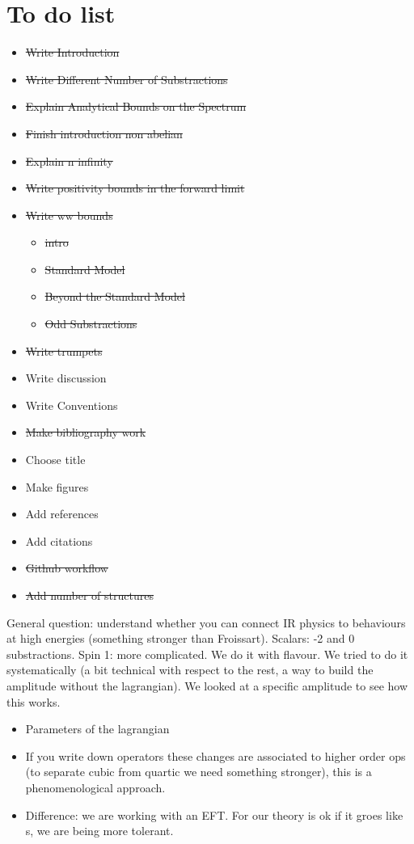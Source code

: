 \chapter{To do list}
\begin{itemize}
    \item \sout{Write Introduction}
    \item \sout{Write Different Number of Substractions}
    \item \sout{Explain Analytical Bounds on the Spectrum }
    \item \sout{Finish introduction non abelian }
    \item \sout{Explain n infinity }
    \item \sout{Write positivity bounds in the forward limit}
    \item \sout{Write ww bounds }
    \begin{itemize}
        \item \sout{intro} 
        \item \sout{Standard Model}
        \item \sout{Beyond the Standard Model}
        \item \sout{Odd Substractions}
    \end{itemize}
    \item \sout{Write trumpets}
    \item Write discussion
    \item Write Conventions 
    \item \sout{Make bibliography work}
    \item Choose title
    \item Make figures
    \item Add references
    \item Add citations
    \item \sout{Github workflow}
    \item \sout{Add number of structures}
\end{itemize}

General question: understand whether you can connect IR physics to behaviours at high energies (something stronger than Froissart). Scalars: -2 and 0 substractions. Spin 1: more complicated. We do it with flavour. We tried to do it systematically (a bit technical with respect to the rest, a way to build the amplitude without the lagrangian). We looked at a specific amplitude to see how this works.
\begin{itemize}
    \item Parameters of the lagrangian 
    \item If you write down operators these changes are associated to higher order ops (to separate cubic from quartic we need something stronger), this is a phenomenological approach.
    \item Difference: we are working with an EFT. For our theory is ok if it groes like s, we are being more tolerant.
\end{itemize}

